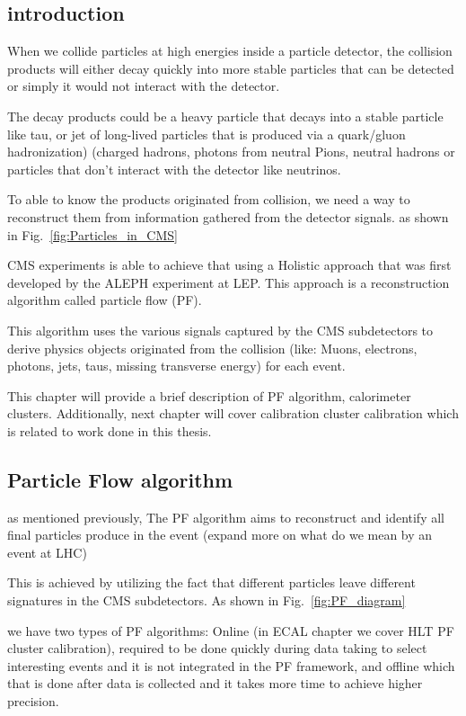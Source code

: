 \subsection{introduction}
When we collide particles at high energies inside a particle detector, the collision products will either decay quickly into more stable particles that can be detected or simply it would not interact with the detector.

The decay products could be a heavy particle that decays into a stable particle like tau, or jet of long-lived particles that is produced via a quark/gluon hadronization) (charged hadrons, photons from neutral Pions, neutral hadrons or particles that don't interact with the detector like neutrinos.

To able to know the products originated from collision, we need a way to reconstruct them from information gathered from the detector signals. as shown in Fig.~\ref{fig:Particles_in_CMS}

CMS experiments is able to achieve that using a Holistic approach that was first developed by the ALEPH experiment at LEP. This approach is a reconstruction algorithm called particle flow (PF).

This algorithm uses the various signals captured by the CMS subdetectors to derive physics objects originated from the collision (like: Muons, electrons, photons, jets, taus, missing transverse energy) for each event.

This chapter will provide a brief description of PF algorithm, calorimeter clusters. Additionally, next chapter will cover calibration cluster calibration which is related to work done in this thesis. 

\subsection{Particle Flow algorithm}

as mentioned previously, The PF algorithm aims to reconstruct and identify all final particles produce in the event (expand more on what do we mean by an event at LHC)

This is achieved by utilizing the fact that different particles leave different signatures in the CMS subdetectors. As shown in Fig.~\ref{fig:PF_diagram}

we have two types of PF algorithms: Online (in ECAL chapter we cover HLT PF cluster calibration), required to be done quickly during data taking to select interesting events and it is not integrated in the PF framework, and offline which that is done after data is collected and it takes more time to achieve higher precision.

